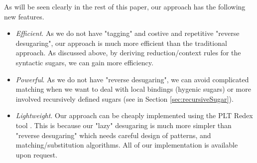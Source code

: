 As will be seen clearly in the rest of this paper, our approach has the following new features.
\begin{itemize}
  \item {\em Efficient}. As we do not have "tagging" and costive and repetitive "reverse desugaring", our approach is much more efficient than the traditional approach. As discussed above, by deriving reduction/context rules for the syntactic sugars, we can gain more efficiency.

  \item {\em Powerful}. As we do not have "reverse desugaring", we can avoid complicated matching when we want to deal with local bindings (hygenic sugars) or more involved recursively defined sugars (see  in Section \ref{sec:recursiveSugar}).

  \item {\em Lightweight}. Our approach can be cheaply implemented using the PLT Redex tool \cite{SEwPR}. This is because our "lazy" desugaring is much more simpler than "reverse desugaring" which needs careful design of patterns, and matching/substitution algorithms. All of our implementation is available upon request.

\end{itemize}
